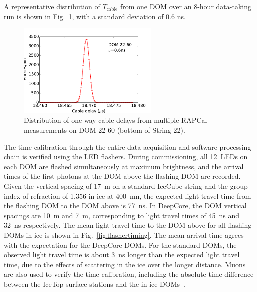 \noindent A representative distribution of $T_{\mathrm{cable}}$ from one DOM over an 8-hour
data-taking run is shown in Fig.~\ref{fig:rapcal_cable_len}, with a
standard deviation of 0.6 ns.

\begin{figure}[!h]
 \centering
 \includegraphics[width=0.6\textwidth]{graphics/dom/rapcal/tcal_hist_22-60.pdf}
 \caption{Distribution of one-way cable delays from multiple RAPCal
   measurements on DOM 22-60 (bottom of String 22).}
 \label{fig:rapcal_cable_len}
\end{figure}

The time calibration through the entire data acquisition and software
processing chain is verified using the LED flashers. During
commissioning, all 12~LEDs on each DOM are flashed simultaneously at
maximum brightness, and the arrival times of the first photons at the DOM above the flashing DOM
are recorded. Given the vertical spacing of 17~m on a standard IceCube
string and the group index of
refraction of  1.356 in ice at 400~nm, the expected light travel time
from the flashing DOM to the DOM above is 77~ns. In DeepCore, the DOM
vertical spacings are 10~m and 7~m, corresponding to light travel
times of 45~ns and 32~ns respectively. The mean light travel
time to the DOM above for all flashing DOMs in ice is shown in
Fig.~\ref{fig:flashertiming}. The mean arrival time agrees with the
expectation for the DeepCore DOMs. For the standard DOMs, the observed
light travel time is about 3~ns longer than the expected light travel
time, due to the effects of scattering in the ice over the longer distance. Muons are also used to
verify the time calibration, including the absolute time difference
between the IceTop surface stations and the in-ice DOMs~\cite{IC3:perf}.


